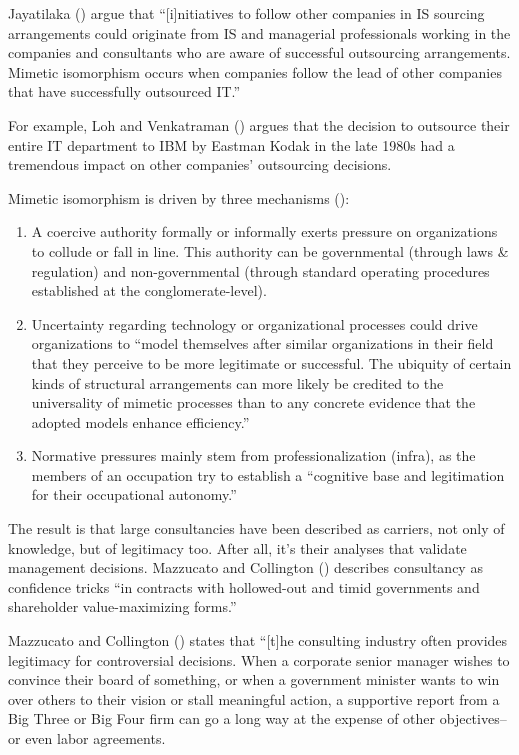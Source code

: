 \documentclass[
  man,floatsintext]{apa6}
\providecommand{\tightlist}{%
  \setlength{\itemsep}{0pt}\setlength{\parskip}{0pt}}
\begin{document}
Jayatilaka () argue that ``{[}i{]}nitiatives to follow other companies in IS sourcing arrangements could originate from IS and managerial professionals working in the companies and consultants who are aware of successful outsourcing arrangements. Mimetic isomorphism occurs when companies follow the lead of other companies that have successfully outsourced IT.''

For example, Loh and Venkatraman () argues that the decision to outsource their entire IT department to IBM by Eastman Kodak in the late 1980s had a tremendous impact on other companies' outsourcing decisions.

Mimetic isomorphism is driven by three mechanisms ():

\begin{enumerate}
\def\labelenumi{\arabic{enumi}.}
\tightlist
\item
  A coercive authority formally or informally exerts pressure on organizations to collude or fall in line. This authority can be governmental (through laws \& regulation) and non-governmental (through standard operating procedures established at the conglomerate-level).
\item
  Uncertainty regarding technology or organizational processes could drive organizations to ``model themselves after similar organizations in their field that they perceive to be more legitimate or successful. The ubiquity of certain kinds of structural arrangements can more likely be credited to the universality of mimetic processes than to any concrete evidence that the adopted models enhance efficiency.''
\item
  Normative pressures mainly stem from professionalization (infra), as the members of an occupation try to establish a ``cognitive base and legitimation for their occupational autonomy.''
\end{enumerate}

The result is that large consultancies have been described as carriers, not only of knowledge, but of legitimacy too. After all, it's their analyses that validate management decisions. Mazzucato and Collington () describes consultancy as confidence tricks ``in contracts with hollowed-out and timid governments and shareholder value-maximizing forms.''

Mazzucato and Collington () states that ``{[}t{]}he consulting industry often provides legitimacy for controversial decisions. When a corporate senior manager wishes to convince their board of something, or when a government minister wants to win over others to their vision or stall meaningful action, a supportive report from a Big Three or Big Four firm can go a long way at the expense of other objectives--or even labor agreements.
\end{document}
